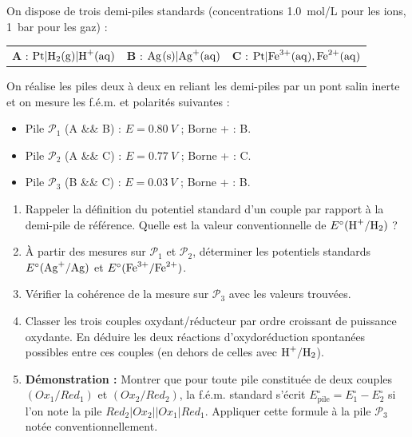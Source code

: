 \documentclass[11pt]{article}
\begin{document}
\begin{exercice}
On dispose de trois demi-piles standards (concentrations \SI{1,0}{mol/L} pour les ions, \SI{1}{bar} pour les gaz) : 
\begin{center}
\begin{tabular}{lll}
\textbf{A} : $\ce{Pt} | \ce{H2(g)} | \ce{H+(aq)}$ & \textbf{B} : $\ce{Ag(s)} | \ce{Ag+(aq)}$ & \textbf{C} : $\ce{Pt} | \ce{Fe^{3+}(aq), Fe^{2+}(aq)}$
\end{tabular}
\end{center}
On réalise les piles deux à deux en reliant les demi-piles par un pont salin inerte et on mesure les f.é.m. et polarités suivantes :
\begin{itemize}
    \item Pile $\mathcal{P}_1$ (A \&\& B) : $E = \SI{0,80}{V}$ ; Borne + : B.
    \item Pile $\mathcal{P}_2$ (A \&\& C) : $E = \SI{0,77}{V}$ ; Borne + : C.
    \item Pile $\mathcal{P}_3$ (B \&\& C) : $E = \SI{0,03}{V}$ ; Borne + : B.
\end{itemize}
\begin{enumerate}
    \item Rappeler la définition du potentiel standard d'un couple par rapport à la demi-pile de référence. Quelle est la valeur conventionnelle de $E^\circ(\ce{H+/H2})$ ?
    \item À partir des mesures sur $\mathcal{P}_1$ et $\mathcal{P}_2$, déterminer les potentiels standards $E^\circ(\ce{Ag+/Ag})$ et $E^\circ(\ce{Fe^{3+}/Fe^{2+}})$.
    \item Vérifier la cohérence de la mesure sur $\mathcal{P}_3$ avec les valeurs trouvées.
    \item Classer les trois couples oxydant/réducteur par ordre croissant de puissance oxydante. En déduire les deux réactions d'oxydoréduction spontanées possibles entre ces couples (en dehors de celles avec $\ce{H+/H2}$).
    \item \textbf{Démonstration :} Montrer que pour toute pile constituée de deux couples $(Ox_1/Red_1)$ et $(Ox_2/Red_2)$, la f.é.m. standard s'écrit $E^\circ_{\text{pile}} = E^\circ_1 - E^\circ_2$ si l'on note la pile $Red_2 | Ox_2 || Ox_1 | Red_1$. Appliquer cette formule à la pile $\mathcal{P}_3$ notée conventionnellement.
\end{enumerate}
\end{exercice}
\end{document}
